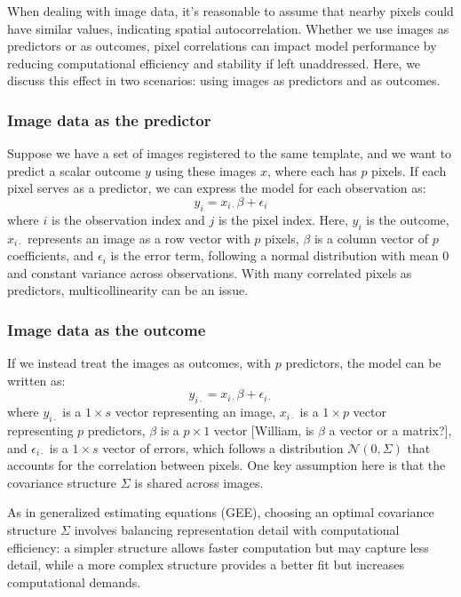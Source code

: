 \documentclass[12pt]{article}
\begin{document}
When dealing with image data, it's reasonable to assume that nearby pixels could have similar values, indicating spatial autocorrelation. Whether we use images as predictors or as outcomes, pixel correlations can impact model performance by reducing computational efficiency and stability if left unaddressed. Here, we discuss this effect in two scenarios: using images as predictors and as outcomes.

\subsubsection*{Image data as the predictor}

Suppose we have a set of images registered to the same template, and we want to predict a scalar outcome \( y \) using these images \( x \), where each has \( p \) pixels. If each pixel serves as a predictor, we can express the model for each observation as:
\[
  y_i = x_{i \cdot} \beta + \epsilon_i
\]
where \( i \) is the observation index and \( j \) is the pixel index. Here, \( y_i \) is the outcome, \( x_{i \cdot} \) represents an image as a row vector with \( p \) pixels, \( \beta \) is a column vector of \( p \) coefficients, and \( \epsilon_i \) is the error term, following a normal distribution with mean 0 and constant variance across observations. With many correlated pixels as predictors, multicollinearity can be an issue.

\subsubsection*{Image data as the outcome}

If we instead treat the images as outcomes, with \( p \) predictors, the model can be written as:
\[
  y_{i \cdot} = x_{i \cdot} \beta + \epsilon_{i \cdot}
\]
where \( y_{i \cdot} \) is a \( 1 \times s \) vector representing an image, \( x_{i \cdot} \) is a \( 1 \times p \) vector representing \( p \) predictors, \( \beta \) is a \( p \times 1 \) vector [William, is \( \beta \) a vector or a matrix?], and \( \epsilon_{i \cdot} \) is a \( 1 \times s \) vector of errors, which follows a distribution \( \mathcal{N}(0, \Sigma) \) that accounts for the correlation between pixels. One key assumption here is that the covariance structure \( \Sigma \) is shared across images.

As in generalized estimating equations (GEE), choosing an optimal covariance structure \( \Sigma \) involves balancing representation detail with computational efficiency: a simpler structure allows faster computation but may capture less detail, while a more complex structure provides a better fit but increases computational demands.
\end{document}
